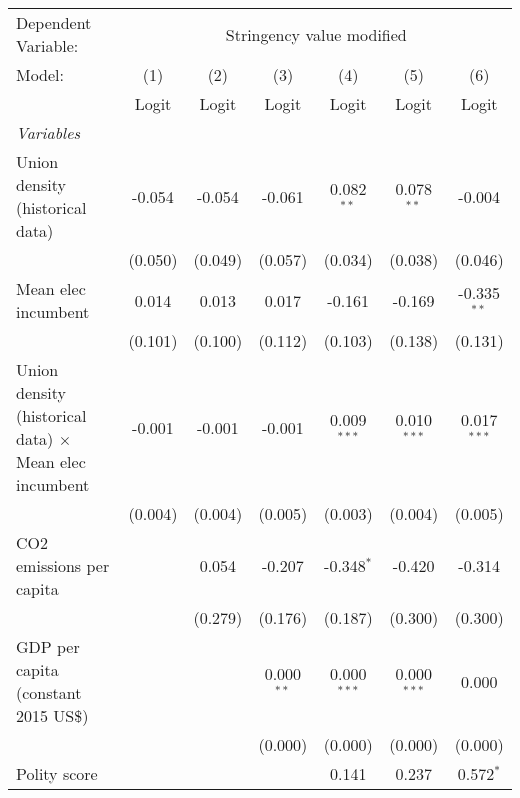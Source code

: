 
\begingroup
\centering
\begin{tabular}{lcccccc}
   \toprule
   Dependent Variable: & \multicolumn{6}{c}{Stringency value modified}\\
   Model:                                                        & (1)     & (2)     & (3)          & (4)           & (5)           & (6)\\  
                                                                 &  Logit  & Logit   & Logit        & Logit         & Logit         & Logit\\  
   \midrule
   \emph{Variables}\\
   Union density (historical data)                               & -0.054  & -0.054  & -0.061       & 0.082$^{**}$  & 0.078$^{**}$  & -0.004\\   
                                                                 & (0.050) & (0.049) & (0.057)      & (0.034)       & (0.038)       & (0.046)\\   
   Mean elec incumbent                                           & 0.014   & 0.013   & 0.017        & -0.161        & -0.169        & -0.335$^{**}$\\   
                                                                 & (0.101) & (0.100) & (0.112)      & (0.103)       & (0.138)       & (0.131)\\   
   Union density (historical data) $\times$ Mean elec incumbent  & -0.001  & -0.001  & -0.001       & 0.009$^{***}$ & 0.010$^{***}$ & 0.017$^{***}$\\   
                                                                 & (0.004) & (0.004) & (0.005)      & (0.003)       & (0.004)       & (0.005)\\   
   CO2 emissions per capita                                      &         & 0.054   & -0.207       & -0.348$^{*}$  & -0.420        & -0.314\\   
                                                                 &         & (0.279) & (0.176)      & (0.187)       & (0.300)       & (0.300)\\   
   GDP per capita (constant 2015 US\$)                           &         &         & 0.000$^{**}$ & 0.000$^{***}$ & 0.000$^{***}$ & 0.000\\   
                                                                 &         &         & (0.000)      & (0.000)       & (0.000)       & (0.000)\\   
   Polity score                                                  &         &         &              & 0.141         & 0.237         & 0.572$^{*}$\\   

\end{tabular}
